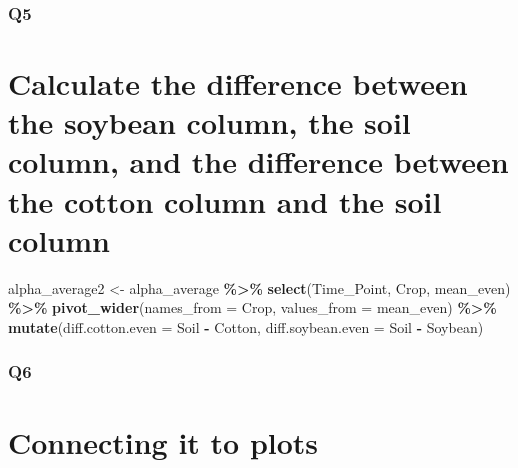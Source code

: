 \documentclass[
]{article}
\newenvironment{Shaded}{\begin{snugshade}}{\end{snugshade}}
\newcommand{\AttributeTok}[1]{\textcolor[rgb]{0.13,0.29,0.53}{#1}}
\newcommand{\FunctionTok}[1]{\textcolor[rgb]{0.13,0.29,0.53}{\textbf{#1}}}
\newcommand{\NormalTok}[1]{#1}
\newcommand{\OtherTok}[1]{\textcolor[rgb]{0.56,0.35,0.01}{#1}}
\newcommand{\SpecialCharTok}[1]{\textcolor[rgb]{0.81,0.36,0.00}{\textbf{#1}}}
\begin{document}
\subsubsection{Q5}\label{q5}

\section{Calculate the difference between the soybean column, the soil
column, and the difference between the cotton column and the soil
column}\label{calculate-the-difference-between-the-soybean-column-the-soil-column-and-the-difference-between-the-cotton-column-and-the-soil-column}

\begin{Shaded}
\begin{Highlighting}[]
\NormalTok{alpha\_average2 }\OtherTok{\textless{}{-}}\NormalTok{ alpha\_average }\SpecialCharTok{\%\textgreater{}\%}
                  \FunctionTok{select}\NormalTok{(Time\_Point, Crop, mean\_even) }\SpecialCharTok{\%\textgreater{}\%}
                  \FunctionTok{pivot\_wider}\NormalTok{(}\AttributeTok{names\_from =}\NormalTok{ Crop, }\AttributeTok{values\_from =}\NormalTok{ mean\_even) }\SpecialCharTok{\%\textgreater{}\%}
                  \FunctionTok{mutate}\NormalTok{(}\AttributeTok{diff.cotton.even =}\NormalTok{ Soil }\SpecialCharTok{{-}}\NormalTok{ Cotton,}
                         \AttributeTok{diff.soybean.even =}\NormalTok{ Soil }\SpecialCharTok{{-}}\NormalTok{ Soybean)}
\end{Highlighting}
\end{Shaded}

\subsubsection{Q6}\label{q6}

\section{Connecting it to plots}\label{connecting-it-to-plots}
\end{document}
